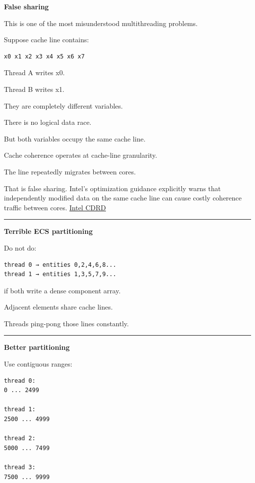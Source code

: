 \textbf{False sharing}

This is one of the most misunderstood multithreading problems.

Suppose cache line contains:

\begin{verbatim}
x0 x1 x2 x3 x4 x5 x6 x7
\end{verbatim}

Thread A writes x0.

Thread B writes x1.

They are completely different variables.

There is no logical data race.

But both variables occupy the same cache line.

Cache coherence operates at cache-line granularity.

The line repeatedly migrates between cores.

That is false sharing. Intel's optimization guidance explicitly warns that independently modified data on the same cache line can cause costly coherence traffic between cores. \href{https://cdrdv2-public.intel.com/814198/248966-Optimization-Reference-Manual-V1-049.pdf?utm_source=chatgpt.com}{Intel CDRD}

\begin{center}\rule{0.5\linewidth}{0.5pt}\end{center}

\textbf{Terrible ECS partitioning}

Do not do:

\begin{verbatim}
thread 0 → entities 0,2,4,6,8...
thread 1 → entities 1,3,5,7,9...
\end{verbatim}

if both write a dense component array.

Adjacent elements share cache lines.

Threads ping-pong those lines constantly.

\begin{center}\rule{0.5\linewidth}{0.5pt}\end{center}

\textbf{Better partitioning}

Use contiguous ranges:

\begin{verbatim}
thread 0:
0 ... 2499

thread 1:
2500 ... 4999

thread 2:
5000 ... 7499

thread 3:
7500 ... 9999
\end{verbatim}

